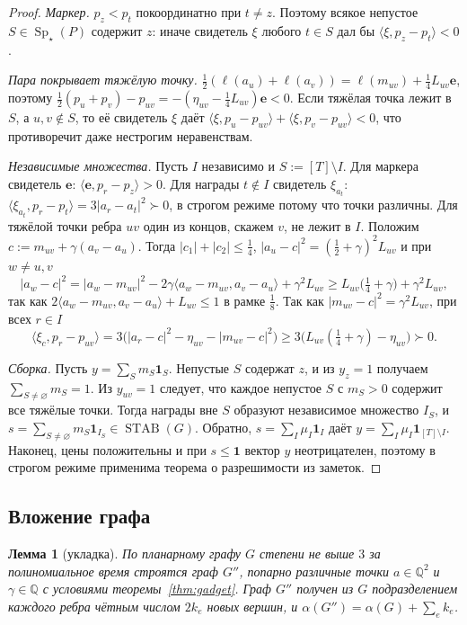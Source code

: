 \documentclass[a4paper,11pt]{article}
\theoremstyle{plain}
\newtheorem{lemma}[theorem]{Лемма}
\theoremstyle{definition}
\theoremstyle{remark}
\newcommand{\Q}{\mathbb{Q}}
\newcommand{\abs}[1]{\left\lvert #1 \right\rvert}
\newcommand{\ip}[2]{\langle #1, #2\rangle}
\DeclareMathOperator{\Sp}{Sp}
\DeclareMathOperator{\STAB}{STAB}
\newcommand{\Spm}{\Sp_\star}
\newcommand{\gs}{\mathrel{\succ}}
\begin{document}
\begin{proof}
    \emph{Маркер.} $p_z<p_t$ покоординатно при $t\ne z$. Поэтому всякое непустое $S\in\Spm(P)$ содержит $z$: иначе свидетель $\xi$ любого $t\in S$ дал бы $\ip{\xi}{p_z-p_t}<0$.

    \emph{Пара покрывает тяжёлую точку.} $\tfrac12(\ell(a_u)+\ell(a_v))=\ell(m_{uv})+\tfrac14L_{uv}\mathbf e$, поэтому $\tfrac12(p_u+p_v)-p_{uv}=-(\eta_{uv}-\tfrac14L_{uv})\mathbf e<0$. Если тяжёлая точка лежит в $S$, а $u,v\notin S$, то её свидетель $\xi$ даёт $\ip{\xi}{p_u-p_{uv}}+\ip{\xi}{p_v-p_{uv}}<0$, что противоречит даже нестрогим неравенствам.

    \emph{Независимые множества.} Пусть $I$ независимо и $S:=[T]\setminus I$. Для маркера свидетель $\mathbf e$: $\ip{\mathbf e}{p_r-p_z}>0$. Для награды $t\notin I$ свидетель $\xi_{a_t}$: $\ip{\xi_{a_t}}{p_r-p_t}=3\abs{a_r-a_t}^2\gs0$, в строгом режиме потому что точки различны. Для тяжёлой точки ребра $uv$ один из концов, скажем $v$, не лежит в $I$. Положим $c:=m_{uv}+\gamma(a_v-a_u)$. Тогда $\abs{c_1}+\abs{c_2}\le\tfrac14$, $\abs{a_u-c}^2=(\tfrac12+\gamma)^2L_{uv}$ и при $w\ne u,v$
    \[
        \abs{a_w-c}^2=\abs{a_w-m_{uv}}^2-2\gamma\ip{a_w-m_{uv}}{a_v-a_u}+\gamma^2L_{uv}\ge L_{uv}\bigl(\tfrac14+\gamma\bigr)+\gamma^2L_{uv},
    \]
    так как $2\ip{a_w-m_{uv}}{a_v-a_u}+L_{uv}\le1$ в рамке $\tfrac18$. Так как $\abs{m_{uv}-c}^2=\gamma^2L_{uv}$, при всех $r\in I$
    \[
        \ip{\xi_c}{p_r-p_{uv}}=3\bigl(\abs{a_r-c}^2-\eta_{uv}-\abs{m_{uv}-c}^2\bigr)\ge3\bigl(L_{uv}(\tfrac14+\gamma)-\eta_{uv}\bigr)\gs0.
    \]

    \emph{Сборка.} Пусть $y=\sum_Sm_S\mathbf 1_S$. Непустые $S$ содержат $z$, и из $y_z=1$ получаем $\sum_{S\ne\varnothing}m_S=1$. Из $y_{uv}=1$ следует, что каждое непустое $S$ с $m_S>0$ содержит все тяжёлые точки. Тогда награды вне $S$ образуют независимое множество $I_S$, и $s=\sum_{S\ne\varnothing}m_S\mathbf 1_{I_S}\in\STAB(G)$. Обратно, $s=\sum_I\mu_I\mathbf 1_I$ даёт $y=\sum_I\mu_I\mathbf 1_{[T]\setminus I}$. Наконец, цены положительны и при $s\le\mathbf 1$ вектор $y$ неотрицателен, поэтому в строгом режиме применима теорема о разрешимости из заметок.
\end{proof}

\subsection{Вложение графа}

\begin{lemma}[укладка]\label{lem:draw}
    По планарному графу $G$ степени не выше $3$ за полиномиальное время строятся граф $G''$, попарно различные точки $a\in\Q^2$ и $\gamma\in\Q$ с условиями теоремы~\ref{thm:gadget}. Граф $G''$ получен из $G$ подразделением каждого ребра чётным числом $2k_e$ новых вершин, и $\alpha(G'')=\alpha(G)+\sum_ek_e$.
\end{lemma}
\end{document}
